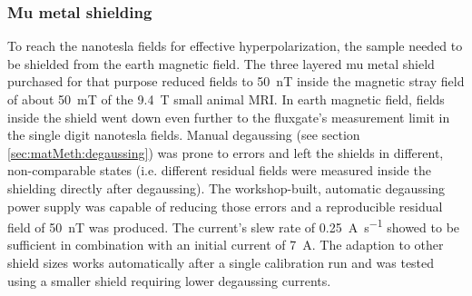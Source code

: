         \subsubsection{Mu metal shielding}
        To reach the nanotesla fields for effective hyperpolarization, the sample needed to be shielded from the earth magnetic field. The three layered mu metal shield purchased for that purpose reduced fields to \SI{50}{\nano\tesla} inside the magnetic stray field of about \SI{50}{\milli\tesla} of the \SI{9.4}{\tesla} small animal MRI. In earth magnetic field, fields inside the shield went down even further to the fluxgate's measurement limit in the single digit nanotesla fields. Manual degaussing (see section \ref{sec:matMeth:degaussing}) was prone to errors and left the shields in different, non-comparable states (i.e. different residual fields were measured inside the shielding directly after degaussing). The workshop-built, automatic degaussing power supply was capable of reducing those errors and a reproducible residual field of \SI{50}{\nano\tesla} was produced. The current's slew rate of \SI{0.25}{\ampere\per\second} showed to be sufficient in combination with an initial current of \SI{7}{\ampere}. The adaption to other shield sizes works automatically after a single calibration run and was tested using a smaller shield requiring lower degaussing currents.
